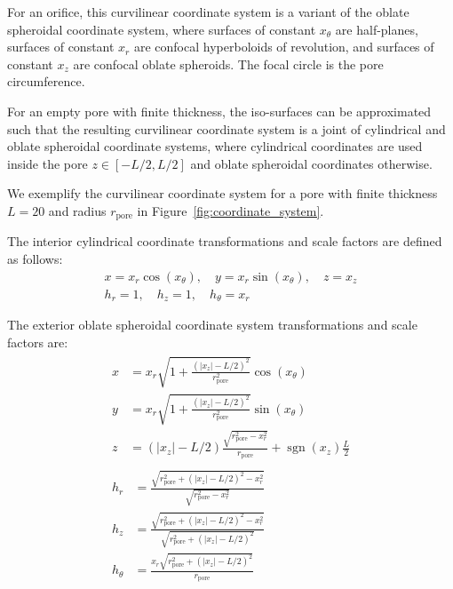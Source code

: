 \documentclass[10pt, a4paper]{article}
\begin{document}
\begin{multicols}{2}
For an orifice, this curvilinear coordinate system is a variant of the oblate spheroidal coordinate system, where surfaces of constant $x_{\theta}$ are half-planes, surfaces of constant $x_{r}$ are confocal hyperboloids of revolution, and surfaces of constant $x_{z}$ are confocal oblate spheroids.
The focal circle is the pore circumference.

For an empty pore with finite thickness, the iso-surfaces can be approximated such that the resulting curvilinear coordinate system is a joint of cylindrical and oblate spheroidal coordinate systems,
where cylindrical coordinates are used inside the pore $z \in [-L/2, L/2]$ and oblate spheroidal coordinates otherwise.

We exemplify the curvilinear coordinate system for a pore with finite thickness $L = 20$ and radius $r_{\textrm{pore}}$ in Figure~\ref{fig:coordinate_system}.

The interior cylindrical coordinate transformations and scale factors are defined as follows:
\begin{gather}
    \label{eq:cyl_transformation_1}
    x = x_r \cos(x_{\theta}), \quad
    y = x_r \sin(x_{\theta}), \quad
    z = x_z
    \\
    \label{eq:cyl_transformation_2}
    h_r = 1, \quad
    h_z = 1, \quad
    h_{\theta} = x_r
\end{gather}

The exterior oblate spheroidal coordinate system transformations and scale factors are:
\begin{gather}
    \begin{aligned}\label{eq:oblate_spheroid_transformation_1}
        x &= x_r
        \sqrt{1 + \frac{(|x_z| - L/2)^2}{r_{\textrm{pore}}^2}}
        \cos(x_{\theta})
        \\
        y &= x_r
        \sqrt{1 + \frac{(|x_z| - L/2)^2}{r_{\textrm{pore}}^2}}
        \sin(x_{\theta})
        \\
        z &= (|x_z| - L/2) \frac{\sqrt{r_{\textrm{pore}}^2 - x_r^2}}{r_{\textrm{pore}}} + \operatorname{sgn}(x_z) \frac{L}{2}
    \end{aligned}
    \\[4pt]
    \begin{aligned}\label{eq:oblate_spheroid_transformation_2}
        h_r &= \frac{\sqrt{r_{\textrm{pore}}^2 + (|x_z| - L/2)^2 - x_r^2}}{\sqrt{r_{\textrm{pore}}^2 - x_r^2}}
        \\
        h_z &= \frac{\sqrt{r_{\textrm{pore}}^2 + (|x_z| - L/2)^2 - x_r^2}}{\sqrt{r_{\textrm{pore}}^2 + (|x_z| - L/2)^2}}
        \\
        h_{\theta} &= \frac{x_r \sqrt{r_{\textrm{pore}}^2 + (|x_z| - L/2)^2}}{r_{\textrm{pore}}}
    \end{aligned}
\end{gather}


\end{multicols}
\end{document}
